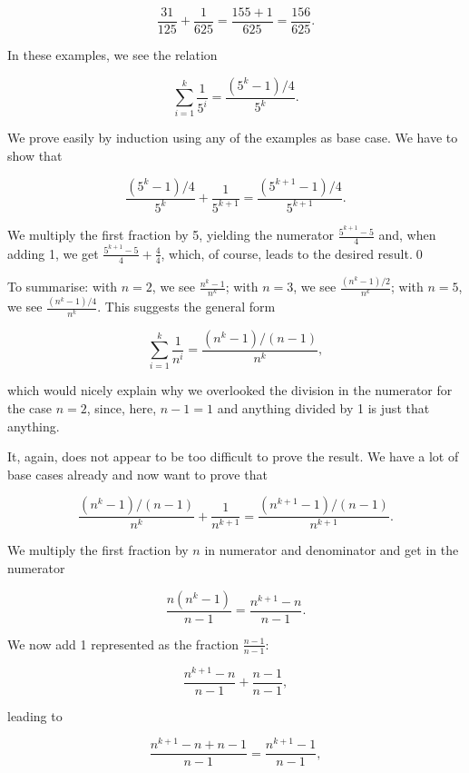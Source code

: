 \documentclass[tikz]{scrreprt}
\begin{document}
\[
\frac{31}{125} + \frac{1}{625} =
\frac{155+1}{625} = \frac{156}{625}.
\]

In these examples, we see the relation 

\begin{equation}\label{eq:Zeno5}
\sum_{i=1}^k{\frac{1}{5^i}} = 
\frac{(5^k - 1)/ 4}{5^k}.
\end{equation}

We prove easily by induction using any
of the examples as base case.
We have to show that

\begin{equation} 
\frac{(5^k - 1)/4}{5^k} + \frac{1}{5^{k+1}} =
\frac{(5^{k+1} - 1)/4}{5^{k+1}}.
\end{equation} 

We multiply the first fraction by 5, yielding the numerator
$\frac{5^{k+1} - 5}{4}$ and, when adding 1, we get
$\frac{5^{k+1} - 5}{4} + \frac{4}{4}$, which, of course,
leads to the desired result.\qed

To summarise:
with $n=2$, we see $\frac{n^k - 1}{n^k}$;
with $n=3$, we see $\frac{(n^k - 1)/2}{n^k}$;
with $n=5$, we see $\frac{(n^k - 1)/4}{n^k}$.
This suggests the general form

\begin{equation}
\sum_{i=1}^k{\frac{1}{n^i}} =
\frac{(n^k - 1) / (n-1)}{n^k},
\end{equation}

which would nicely explain why we overlooked
the division in the numerator for the case $n=2$,
since, here, $n-1 = 1$ and anything
divided by 1 is just that anything.

It, again, does not appear to be too difficult to prove
the result.
We have a lot of base cases already
and now want to prove that

\begin{equation}
\frac{(n^k - 1) / (n-1)}{n^k} + \frac{1}{n^{k+1}} =
\frac{(n^{k+1} - 1) / (n-1)}{n^{k+1}}.
\end{equation}

We multiply the first fraction by $n$
in numerator and denominator and get 
in the numerator

\[
\frac{n(n^k - 1)}{n-1} = 
\frac{n^{k+1} - n}{n-1}.
\]

We now add 1 represented as the fraction $\frac{n-1}{n-1}$:

\[
\frac{n^{k+1} - n}{n-1} + \frac{n-1}{n-1},
\]

leading to 

\[
\frac{n^{k+1} - n + n - 1}{n-1} =
\frac{n^{k+1} - 1}{n-1},
\]
\end{document}
